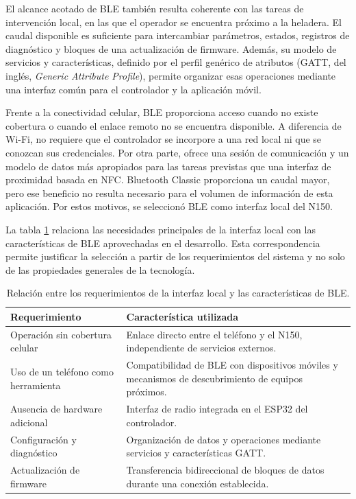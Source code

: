 El alcance acotado de BLE también resulta coherente con las tareas de intervención local, en las que el operador se encuentra próximo a la heladera. El caudal disponible es suficiente para intercambiar parámetros, estados, registros de diagnóstico y bloques de una actualización de firmware. Además, su modelo de servicios y características, definido por el perfil genérico de atributos (GATT, del inglés, \textit{Generic Attribute Profile}), permite organizar esas operaciones mediante una interfaz común para el controlador y la aplicación móvil.

Frente a la conectividad celular, BLE proporciona acceso cuando no existe cobertura o cuando el enlace remoto no se encuentra disponible. A diferencia de Wi-Fi, no requiere que el controlador se incorpore a una red local ni que se conozcan sus credenciales. Por otra parte, ofrece una sesión de comunicación y un modelo de datos más apropiados para las tareas previstas que una interfaz de proximidad basada en NFC. Bluetooth Classic proporciona un caudal mayor, pero ese beneficio no resulta necesario para el volumen de información de esta aplicación. Por estos motivos, se seleccionó BLE como interfaz local del N150.

La tabla \ref{tab:requerimientos_ble} relaciona las necesidades principales de la interfaz local con las características de BLE aprovechadas en el desarrollo. Esta correspondencia permite justificar la selección a partir de los requerimientos del sistema y no solo de las propiedades generales de la tecnología.

\begin{table}[htbp]
	\centering
	\caption{Relación entre los requerimientos de la interfaz local y las características de BLE.}
	\begin{tabular}{p{} p{}}
		\toprule
		\textbf{Requerimiento} & \textbf{Característica utilizada} \\
		\midrule
		Operación sin cobertura celular & Enlace directo entre el teléfono y el N150, independiente de servicios externos. \\
		Uso de un teléfono como herramienta & Compatibilidad de BLE con dispositivos móviles y mecanismos de descubrimiento de equipos próximos. \\
		Ausencia de hardware adicional & Interfaz de radio integrada en el ESP32 del controlador. \\
		Configuración y diagnóstico & Organización de datos y operaciones mediante servicios y características GATT. \\
		Actualización de firmware & Transferencia bidireccional de bloques de datos durante una conexión establecida. \\
		\bottomrule
	\end{tabular}
	\label{tab:requerimientos_ble}
\end{table}

